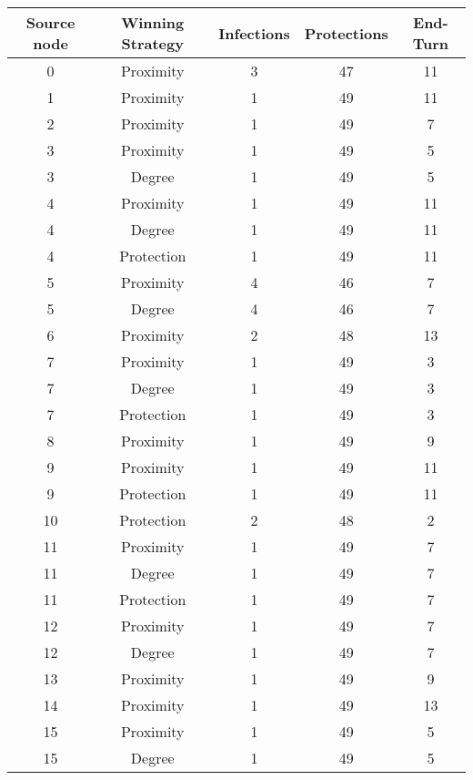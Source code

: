 \documentclass[results.tex]{subfiles}
\begin{document}
\begin{center}
  \begin{tabular}{| c || c | c | c | c |}
    \hline
    {\bfseries Source node} & {\bfseries Winning Strategy} & {\bfseries Infections} & {\bfseries Protections} & {\bfseries End-Turn} \\  %
    \hline\hline
    0 & Proximity & 3 & 47 & 11 \\ 
    \hline
    1 & Proximity & 1 & 49 & 11 \\ 
    \hline
    2 & Proximity & 1 & 49 & 7 \\ 
    \hline
    3 & Proximity & 1 & 49 & 5 \\ 
    \hline
    3 & Degree & 1 & 49 & 5 \\ 
    \hline
    4 & Proximity & 1 & 49 & 11 \\ 
    \hline
    4 & Degree & 1 & 49 & 11 \\ 
    \hline
    4 & Protection & 1 & 49 & 11 \\ 
    \hline
    5 & Proximity & 4 & 46 & 7 \\ 
    \hline
    5 & Degree & 4 & 46 & 7 \\ 
    \hline
    6 & Proximity & 2 & 48 & 13 \\ 
    \hline
    7 & Proximity & 1 & 49 & 3 \\ 
    \hline
    7 & Degree & 1 & 49 & 3 \\ 
    \hline
    7 & Protection & 1 & 49 & 3 \\ 
    \hline
    8 & Proximity & 1 & 49 & 9 \\ 
    \hline
    9 & Proximity & 1 & 49 & 11 \\ 
    \hline
    9 & Protection & 1 & 49 & 11 \\ 
    \hline
    10 & Protection & 2 & 48 & 2 \\ 
    \hline
    11 & Proximity & 1 & 49 & 7 \\ 
    \hline
    11 & Degree & 1 & 49 & 7 \\ 
    \hline
    11 & Protection & 1 & 49 & 7 \\ 
    \hline
    12 & Proximity & 1 & 49 & 7 \\ 
    \hline
    12 & Degree & 1 & 49 & 7 \\ 
    \hline
    13 & Proximity & 1 & 49 & 9 \\ 
    \hline
    14 & Proximity & 1 & 49 & 13 \\ 
    \hline
    15 & Proximity & 1 & 49 & 5 \\ 
    \hline
    15 & Degree & 1 & 49 & 5 \\ 

\end{tabular}
\end{center}
\end{document}
